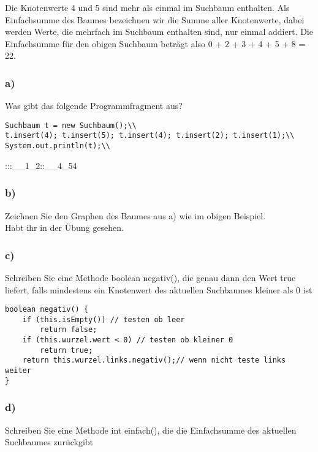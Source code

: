 \documentclass[a4paper, 10pt]{article}
\begin{document}
Die Knotenwerte 4 und 5 sind mehr als einmal im Suchbaum enthalten. Als Einfachsumme
des Baumes bezeichnen wir die Summe aller Knotenwerte, dabei werden Werte, die mehrfach
im Suchbaum enthalten sind, nur einmal addiert. Die Einfachsumme für den obigen
Suchbaum beträgt also 0 + 2 + 3 + 4 + 5 + 8 = 22.


\subsubsection*{a)}
Was gibt das folgende Programmfragment aus?\\

\begin{lstlisting}
Suchbaum t = new Suchbaum();\\
t.insert(4); t.insert(5); t.insert(4); t.insert(2); t.insert(1);\\
System.out.println(t);\\
\end{lstlisting}

:::\_\_1\_2::\_\_4\_54
\subsubsection*{b)}
Zeichnen Sie den Graphen des Baumes aus a) wie im obigen Beispiel.\\

Habt ihr in der Übung gesehen.

\subsubsection*{c)}
Schreiben Sie eine Methode boolean negativ(), die genau dann den Wert true
liefert, falls mindestens ein Knotenwert des aktuellen Suchbaumes kleiner als 0 ist\\

\begin{lstlisting}
boolean negativ() {
    if (this.isEmpty()) // testen ob leer
        return false;   
    if (this.wurzel.wert < 0) // testen ob kleiner 0
        return true;
    return this.wurzel.links.negativ();// wenn nicht teste links weiter
}
\end{lstlisting}

\subsubsection*{d)}
Schreiben Sie eine Methode int einfach(), die die Einfachsumme des aktuellen
Suchbaumes zurückgibt\\
\end{document}
